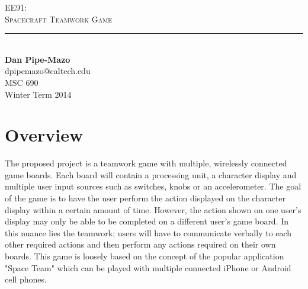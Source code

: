 \documentclass[aps,letterpaper,10pt]{revtex4}
\makeatletter
\newcommand{\labname}{EE91}
\newcommand{\descript}{Spacecraft Teamwork Game}
\newcommand{\authorname}{Dan Pipe-Mazo}
\newcommand{\classno}{Winter Term 2014}
\newcommand{\emailaddr}{dpipemazo@caltech.edu}
\newcommand{\addr}{MSC 690}
\makeatother
\begin{document}


\begin{titlepage}
\begin{center}
{\LARGE \textsc{\labname:} \\ \vspace{4pt}}
{\Large \textsc{\descript} \\ \vspace{4pt}} 
\rule[13pt]{\textwidth}{1pt} \\ \vspace{150pt}
{\Large \textbf{\authorname} \\ \vspace{10pt}}
{\large \emailaddr \\ \vspace{10pt}
\addr \\ \vspace{10pt}
\classno \\ \vspace{10pt}}
\end{center}
\end{titlepage}

\section{Overview}

The proposed project is a teamwork game with multiple, wirelessly connected game boards. Each board will contain a processing unit, a character display and multiple user input sources such as switches, knobs or an accelerometer. The goal of the game is to have the user perform the action displayed on the character display within a certain amount of time. However, the action shown on one user's display may only be able to be completed on a different user's game board. In this nuance lies the teamwork; users will have to communicate verbally to each other required actions and then perform any actions required on their own boards. This game is loosely based on the concept of the popular application "Space Team" which can be played with multiple connected iPhone or Android cell phones. \\
\end{document}
